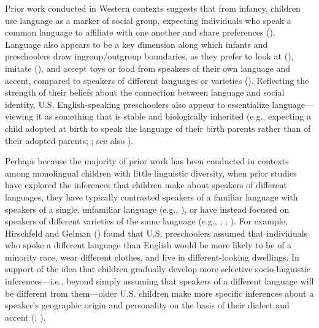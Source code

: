 \documentclass{foushee-adapted-preprint}
\begin{document}
Prior work conducted in Western contexts suggests that from infancy, children use language as a marker of social group, expecting individuals who speak a common language to affiliate with one another and share preferences (\cite{liberman2017preverbal, liberman2016early}). Language also appears to be a key dimension along which infants and preschoolers draw ingroup/outgroup boundaries, as they prefer to look at (\cite{kinzler2007native}), imitate (\cite{buttelmann2013selective}), and accept toys or food from speakers of their own language and accent, compared to speakers of different languages or varieties (\cite{kinzler2007native, shutts2009social}). Reflecting the strength of their beliefs about the connection between language and social identity, U.S. English-speaking preschoolers also appear to essentialize language---viewing it as something that is stable and biologically inherited (e.g., expecting a child adopted at birth to speak the language of their birth parents rather than of their adopted parents; \cite{hirschfeld1997young}; see also \cite{kinzler2012children}).  

Perhaps because the majority of prior work has been conducted in contexts among monolingual children with little linguistic diversity, when prior studies have explored the inferences that children make about speakers of different languages, they have typically contrasted speakers of a familiar language with speakers of a single, unfamiliar language (e.g., \cite{liberman2017preverbal, hirschfeld1997young, kinzler2012children, kinzler2007native, moon1993two}), or have instead focused on speakers of different varieties of the same language (e.g., \cite{weatherhead2019preschoolers}; \cite{mccullough2019regional}; \cite{kinzler2013northern}). For example, Hirschfeld and Gelman (\citeyear{hirschfeld1997young}) found that U.S. preschoolers assumed that individuals who spoke a different language than English would be more likely to be  of a minority race, wear different clothes, and live in different-looking dwellings. In support of the idea that children gradually develop more selective socio-linguistic inferences---i.e., beyond simply assuming that speakers of a different language will be different from them---older U.S. children make more specific inferences about a speaker's geographic origin and personality on the basis of their dialect and accent (\cite{mccullough2019regional}; \cite{kinzler2013northern}).
\end{document}
